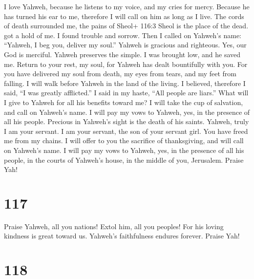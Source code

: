  I love Yahweh, because he listens to my voice, and my cries
for mercy.  Because he has turned his ear to me, therefore I
will call on him as long as I live.  The cords of death
surrounded me, the pains of Sheol+ 116:3 Sheol is the place of the dead.
got a hold of me. I found trouble and sorrow.  Then I called
on Yahweh's name: ``Yahweh, I beg you, deliver my soul.'' 
Yahweh is gracious and righteous. Yes, our God is merciful. 
Yahweh preserves the simple. I was brought low, and he saved me.
 Return to your rest, my soul, for Yahweh has dealt
bountifully with you.  For you have delivered my soul from
death, my eyes from tears, and my feet from falling.  I will
walk before Yahweh in the land of the living.  I believed,
therefore I said, ``I was greatly afflicted.''  I said in
my haste, ``All people are liars.''  What will I give to
Yahweh for all his benefits toward me?  I will take the cup
of salvation, and call on Yahweh's name.  I will pay my
vows to Yahweh, yes, in the presence of all his people. 
Precious in Yahweh's sight is the death of his saints. 
Yahweh, truly I am your servant. I am your servant, the son of your
servant girl. You have freed me from my chains.  I will
offer to you the sacrifice of thanksgiving, and will call on Yahweh's
name.  I will pay my vows to Yahweh, yes, in the presence
of all his people,  in the courts of Yahweh's house, in the
middle of you, Jerusalem. Praise Yah!

\hypertarget{section-107}{%
\section{117}\label{section-107}}

 Praise Yahweh, all you nations! Extol him, all you peoples!
 For his loving kindness is great toward us. Yahweh's
faithfulness endures forever. Praise Yah!

\hypertarget{section-108}{%
\section{118}\label{section-108}}

